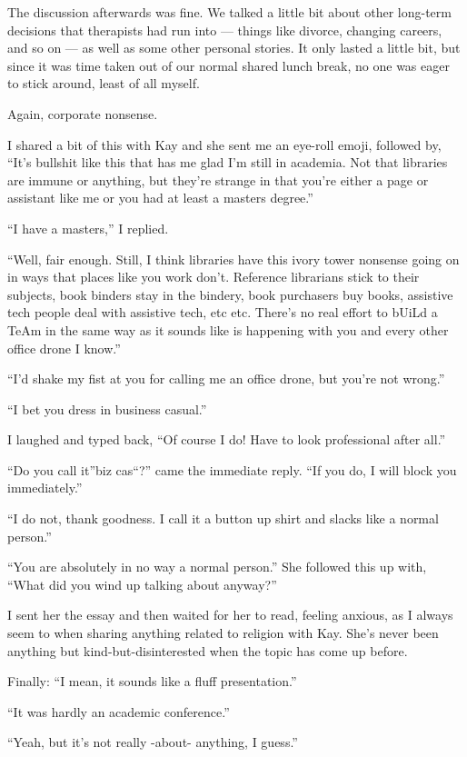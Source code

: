 The discussion afterwards was fine. We talked a little bit about other long-term decisions that therapists had run into --- things like divorce, changing careers, and so on --- as well as some other personal stories. It only lasted a little bit, but since it was time taken out of our normal shared lunch break, no one was eager to stick around, least of all myself.

Again, corporate nonsense.

I shared a bit of this with Kay and she sent me an eye-roll emoji, followed by, ``It's bullshit like this that has me glad I'm still in academia. Not that libraries are immune or anything, but they're strange in that you're either a page or assistant like me or you had at least a masters degree.''

``I have a masters,'' I replied.

``Well, fair enough. Still, I think libraries have this ivory tower nonsense going on in ways that places like you work don't. Reference librarians stick to their subjects, book binders stay in the bindery, book purchasers buy books, assistive tech people deal with assistive tech, etc etc. There's no real effort to bUiLd a TeAm in the same way as it sounds like is happening with you and every other office drone I know.''

``I'd shake my fist at you for calling me an office drone, but you're not wrong.''

``I bet you dress in business casual.''

I laughed and typed back, ``Of course I do! Have to look professional after all.''

``Do you call it''biz cas``?'' came the immediate reply. ``If you do, I will block you immediately.''

``I do not, thank goodness. I call it a button up shirt and slacks like a normal person.''

``You are absolutely in no way a normal person.'' She followed this up with, ``What did you wind up talking about anyway?''

I sent her the essay and then waited for her to read, feeling anxious, as I always seem to when sharing anything related to religion with Kay. She's never been anything but kind-but-disinterested when the topic has come up before.

Finally: ``I mean, it sounds like a fluff presentation.''

``It was hardly an academic conference.''

``Yeah, but it's not really -about- anything, I guess.''

